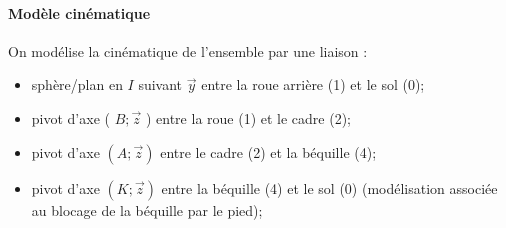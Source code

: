 \paragraph*{Modèle cinématique} On modélise la cinématique de l'ensemble par une liaison :

\begin{itemize}
  \item sphère/plan en \(I\) suivant \(\vec{y}\) entre la roue arrière (1) et le sol (0);
  \item pivot d'axe ( \(B ; \vec{z}\) ) entre la roue (1) et le cadre (2);
  \item pivot d'axe \((A ; \vec{z})\) entre le cadre (2) et la béquille (4);
  \item pivot d'axe \((K ; \vec{z})\) entre la béquille (4) et le sol (0) (modélisation associée au blocage de la béquille par le pied);\\
\end{itemize}

